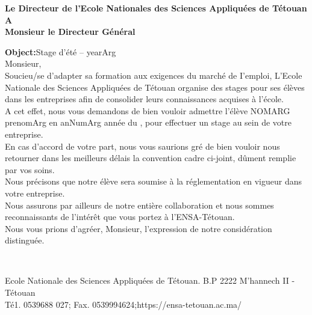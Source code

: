 \documentclass[20pt]{article}
\begin{document}
\thispagestyle{fancy}
\begin{center}
    \textbf{
        Le Directeur de l'Ecole Nationales des Sciences Appliqu\'ees de T\'etouan\\
        A\\
        Monsieur le Directeur G\'en\'eral
    }
    \vspace{1.4em}\\
\end{center}

\textbf{Object:}Stage d'\'et\'e -- yearArg
\vspace{0.7em}\\

Monsieur,
\vspace{0.7em}\\

Soucieu/se d'adapter sa formation aux exigences du marché de I'emploi, L'Ecole
Nationale des Sciences Appliquées de Tétouan organise des stages pour ses élèves dans les
entreprises afin de consolider leurs connaissances acquises à l'école.\\

A cet effet, nous vous demandons de bien vouloir admettre l'élève \uppercase{nomArg}
prenomArg en anNumArg ann\'ee du , pour effectuer un 
stage au sein de votre entreprise.\\

En cas d'accord de votre part, nous vous saurions gré de bien vouloir nous retourner
dans les meilleurs délais la convention cadre ci-joint, dûment remplie par vos soins.\\

Nous précisons que notre élève sera soumise à la réglementation en vigueur dans
votre entreprise.\\

Nous assurons par ailleurs de notre entière collaboration et nous
sommes reconnaissants de l'intérêt que vous portez à l'ENSA-Tétouan.\\

Nous vous prions d'agréer, Monsieur, l'expression de notre considération
distinguée.\\

\vfill


\hrulefill
\vspace{0.3em}\\
\begin{center} 
    Ecole Nationale des Sciences Appliquées de Tétouan. B.P 2222 M'hannech II - Tétouan\\
    Té1. 0539688 027; Fax. 0539994624;https://ensa-tetouan.ac.ma/
\end{center}
\end{document}
